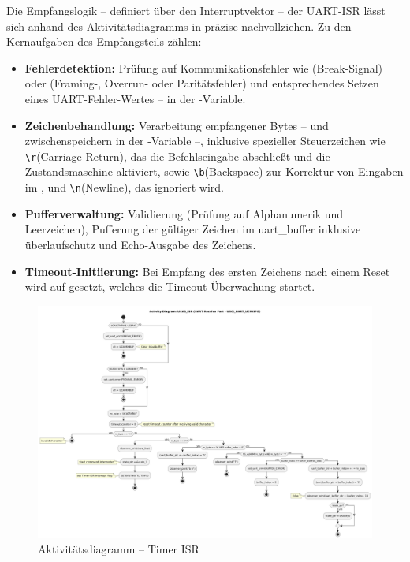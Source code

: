 Die Empfangslogik -- definiert \"uber den Interruptvektor  -- der UART-ISR l\"asst sich anhand des Aktivit\"atsdiagramms in  pr\"azise nachvollziehen. Zu den Kernaufgaben des Empfangsteils z\"ahlen:

\begin{itemize}
	\item \textbf{Fehlerdetektion:} Pr\"ufung auf Kommunikationsfehler wie  (Break-Signal) oder  (Framing-, Overrun- oder Parit\"atsfehler) und entsprechendes Setzen eines UART-Fehler-Wertes -- in der -Variable. 
	
	\item \textbf{Zeichenbehandlung:} Verarbeitung empfangener Bytes -- und zwischenspeichern in der -Variable --, inklusive spezieller Steuerzeichen wie \grqq \texttt{\textbackslash r}\grqq (Carriage Return), das die Befehlseingabe abschlie{\ss}t und die Zustandsmaschine aktiviert, sowie \grqq \texttt{\textbackslash b}\grqq (Backspace) zur Korrektur von Eingaben im , und \grqq \texttt{\textbackslash n}\grqq (Newline), das ignoriert wird.

	\item \textbf{Pufferverwaltung:} Validierung (Pr\"ufung auf Alphanumerik und Leerzeichen), Pufferung der g\"ultiger Zeichen im uart\_buffer inklusive \"uberlaufschutz und Echo-Ausgabe des Zeichens.

	\item \textbf{Timeout-Initiierung:} Bei Empfang des ersten Zeichens nach einem Reset wird  auf  gesetzt, welches die Timeout-\"Uberwachung startet.
\end{itemize}

\newpage
\begin{figure}[h!]
	\centering
	\includegraphics[angle=270, width=1.0\textwidth]{../Bilder/observer_activity_diagram_eusci_receive.png}
	\caption{Aktivit\"atsdiagramm -- Timer ISR}
	\label{fig:activity_diagram_uart_isr_rec}
\end{figure}

